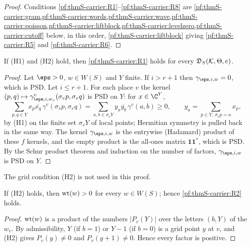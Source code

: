 \begin{proof}
Conditions \ref{pf:thmS-carrier:R1}--\ref{pf:thmS-carrier:R8} are
\cref{pf:thmS-carrier:gram,pf:thmS-carrier:words,pf:thmS-carrier:wave,pf:thmS-carrier:poisson,pf:thmS-carrier:liftblock,pf:thmS-carrier:levelzero,pf:thmS-carrier:cutoff}
below, in this order, \cref{pf:thmS-carrier:liftblock} giving \ref{pf:thmS-carrier:R5} and \ref{pf:thmS-carrier:R6}.
\end{proof}

\begin{lemma}\label{pf:thmS-carrier:gram}
If (H1) and (H2) hold, then \ref{pf:thmS-carrier:R1} holds for every $\mathfrak{D}_S(\mathcal K,\Theta,e)$.
\end{lemma}

\begin{proof}
Let $\eps>0$, $w\in W(S)$ and $Y$ finite. If $i>r+1$ then $\gamma_{\eps,i,w}=0$, which is PSD. Let $i\le r+1$. For each place
$v$ the kernel $(p,q)\mapsto\gamma^v_{\eps,i,w_v}(\sigma_vp,\sigma_vq)$ is PSD on $Y$: for $x\in\C^Y$,
\[
\sum_{p,q\in Y}x_p\overline{x_q}\,\gamma^v(\sigma_vp,\sigma_vq)=\sum_{a,b\in\sigma_vY}y_a\overline{y_b}\,\gamma^v(a,b)\ge0,
\qquad y_a=\sum_{p\in Y,\ \sigma_vp=a}x_p,
\]
by (H1) on the finite set $\sigma_vY$ of local points; Hermitian symmetry is pulled back in the same way. The kernel
$\gamma_{\eps,i,w}$ is the entrywise (Hadamard) product of these $f$ kernels, and the empty product is the all-ones matrix
$\mathbf 1\mathbf 1^*$, which is PSD. By the Schur product theorem \cite[Section 7.5]{HornJohnson2013} and induction on the
number of factors, $\gamma_{\eps,i,w}$ is PSD on $Y$.
\end{proof}

The grid condition (H2) is not used in this proof.

\begin{lemma}\label{pf:thmS-carrier:words}
If (H2) holds, then $\operatorname{wt}(w)>0$ for every $w\in W(S)$; hence \ref{pf:thmS-carrier:R2} holds.
\end{lemma}

\begin{proof}
$\operatorname{wt}(w)$ is a product of the numbers $|P_v(Y)|$ over the letters $(b,Y)$ of the $w_v$. By admissibility, $Y$ (if
$b=1$) or $Y-1$ (if $b=0$) is a grid point $y$ at $v$, and (H2) gives $P_v(y)\ne0$ and $P_v(y+1)\ne0$. Hence every factor is
positive.
\end{proof}

